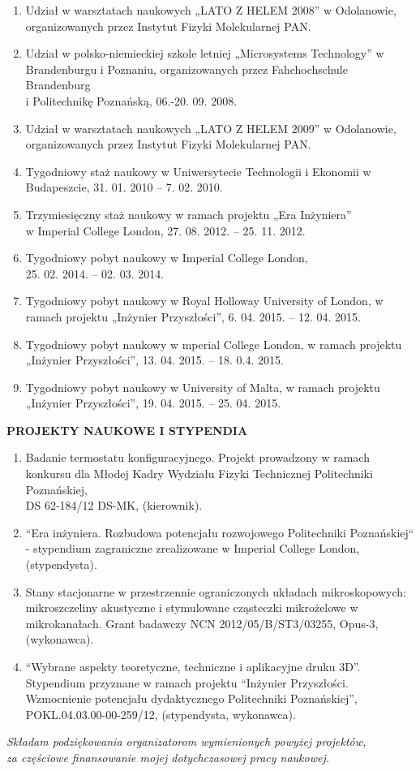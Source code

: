 \documentclass[12pt,a4paper,openright]{report} %
\begin{document}
\begin{enumerate}
\item Udział w warsztatach naukowych „LATO Z HELEM 2008” w Odolanowie, organizowanych przez Instytut Fizyki Molekularnej PAN.
\item Udział w polsko-niemieckiej szkole letniej „Microsystems Technology” w Brandenburgu i Poznaniu, organizowanych przez Fahchochschule Brandenburg \\i Politechnikę Poznańską, 06.-20. 09. 2008.   
\item Udział w warsztatach naukowych „LATO Z HELEM 2009” w Odolanowie, \\organizowanych przez Instytut Fizyki Molekularnej PAN.
\item Tygodniowy staż naukowy w Uniwersytecie Technologii i Ekonomii w Budapeszcie, 31. 01. 2010 – 7. 02. 2010.
\item Trzymiesięczny staż naukowy w ramach projektu „Era Inżyniera” \\w Imperial College London, 27. 08. 2012. – 25. 11. 2012.
\item Tygodniowy pobyt naukowy w Imperial College London, \\25. 02. 2014. – 02. 03. 2014.
\item Tygodniowy pobyt naukowy w Royal Holloway University of London, w ramach projektu „Inżynier Przyszłości”,  6. 04. 2015. – 12. 04. 2015.
\item Tygodniowy pobyt naukowy w mperial College London, w ramach projektu \\„Inżynier Przyszłości”, 13. 04. 2015. – 18. 0.4. 2015.
\item Tygodniowy pobyt naukowy w University of Malta, w ramach projektu \\„Inżynier Przyszłości”, 19. 04. 2015. – 25. 04. 2015.
\end{enumerate}
\textbf{PROJEKTY NAUKOWE I STYPENDIA}
\begin{enumerate}
\item Badanie termostatu konfiguracyjnego. Projekt prowadzony w ramach konkursu dla Młodej Kadry Wydziału Fizyki Technicznej Politechniki Poznańskiej, \\DS 62-184/12 DS-MK, (kierownik).
\item “Era inżyniera. Rozbudowa potencjału rozwojowego Politechniki Poznańskiej“ - stypendium zagraniczne zrealizowane w Imperial College London, (stypendysta).
\item Stany stacjonarne w przestrzennie ograniczonych układach mikroskopowych: mikroszczeliny akustyczne i stymulowane cząsteczki mikrożelowe w mikrokanałach. Grant badawczy NCN 2012/05/B/ST3/03255, Opus-3, (wykonawca).
\item “Wybrane aspekty teoretyczne, techniczne i aplikacyjne druku 3D”. Stypendium przyznane w ramach projektu “Inżynier Przyszłości. Wzmocnienie potencjału dydaktycznego Politechniki Poznańskiej”, POKL.04.03.00-00-259/12, (stypendysta, wykonawca).
\end{enumerate}
\begin{center}
\textit{Składam podziękowania organizatorom wymienionych powyżej projektów,\\za częściowe finansowanie mojej dotychczasowej pracy naukowej.}
\end{center}
\listoffigures



%
\end{document}
